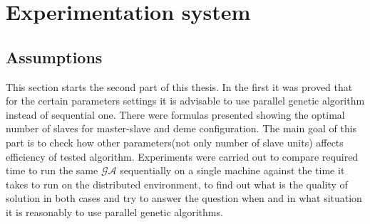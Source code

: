 \section{Experimentation system}
\label{cha:ExperimentAnalysis}
\subsection{Assumptions}
This section starts the second part of this thesis. In the first it was proved
that for the certain parameters settings it is advisable to use parallel genetic
algorithm instead of sequential one. There were formulas presented showing the
optimal number of slaves for master-slave and deme configuration. The main goal
of this part is to check how other parameters(not only number of slave units)
affects efficiency of tested algorithm. Experiments were carried out to compare 
required time to run the same $\mathcal{GA}$
sequentially on a single machine against the time it takes to run on the
distributed environment, to find out what is the quality of solution in both cases and try to answer 
the question when and in what situation it is reasonably to use parallel
genetic algorithms.


